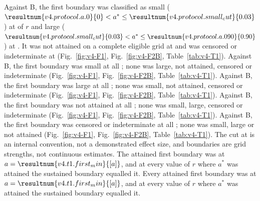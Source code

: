 Against B, the first boundary was classified as small ($\resultnum{v4.protocol.a.0}{0}<a^*\le \resultnum{v4.protocol.small_cut}{0.03}$) at   of $r$ and large ($\resultnum{v4.protocol.small_cut}{0.03}<a^*\le \resultnum{v4.protocol.a.090}{0.90}$) at . It was not attained on a complete eligible grid at   and was censored or indeterminate at  (Fig.~\ref{fig:v4-F1}, Fig.~\ref{fig:v4-F2B}, Table~\ref{tab:v4-T1}). %
Against B, the first boundary was small at all  ; none was large, not attained, censored or indeterminate (Fig.~\ref{fig:v4-F1}, Fig.~\ref{fig:v4-F2B}, Table~\ref{tab:v4-T1}). %
Against B, the first boundary was large at all  ; none was small, not attained, censored or indeterminate (Fig.~\ref{fig:v4-F1}, Fig.~\ref{fig:v4-F2B}, Table~\ref{tab:v4-T1}). %
Against B, the first boundary was not attained at all  ; none was small, large, censored or indeterminate (Fig.~\ref{fig:v4-F1}, Fig.~\ref{fig:v4-F2B}, Table~\ref{tab:v4-T1}). %
Against B, the first boundary was censored or indeterminate at all  ; none was small, large or not attained (Fig.~\ref{fig:v4-F1}, Fig.~\ref{fig:v4-F2B}, Table~\ref{tab:v4-T1}). %
The cut at  is an internal convention, not a demonstrated effect size, and boundaries are grid strengths, not continuous estimates. %
The attained first boundary was at $a=\resultnum{v4.t1.first_min}{[a]}$, and at every value of $r$ where $a^*$ was attained the sustained boundary equalled it. %
Every attained first boundary was at $a=\resultnum{v4.t1.first_min}{[a]}$, and at every value of $r$ where $a^*$ was attained the sustained boundary equalled it. %
